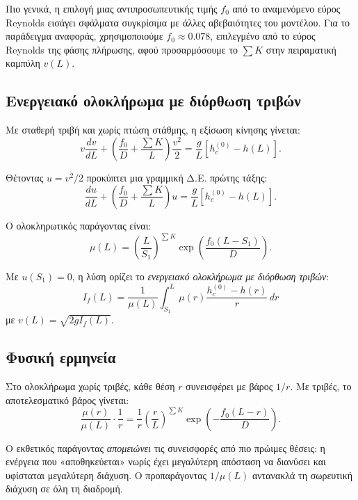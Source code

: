 \documentclass[11pt]{article}
\begin{document}
Πιο γενικά, η επιλογή μιας αντιπροσωπευτικής τιμής $f_0$ από το αναμενόμενο εύρος Reynolds εισάγει σφάλματα συγκρίσιμα με άλλες αβεβαιότητες του μοντέλου. Για το παράδειγμα αναφοράς, χρησιμοποιούμε $f_0 \approx 0.078$, επιλεγμένο από το εύρος Reynolds της φάσης πλήρωσης, αφού προσαρμόσουμε το $\sum K$ στην πειραματική καμπύλη $v(L)$.

\subsection{Ενεργειακό ολοκλήρωμα με διόρθωση τριβών}

Με σταθερή τριβή και χωρίς πτώση στάθμης, η εξίσωση κίνησης γίνεται:
\[
  v \frac{dv}{dL} + \left(\frac{f_0}{D} + \frac{\sum K}{L}\right) \frac{v^2}{2} = \frac{g}{L}[h_c^{(0)} - h(L)].
\]

Θέτοντας $u = v^2/2$ προκύπτει μια γραμμική Δ.Ε. πρώτης τάξης:
\begin{equation}
  \frac{du}{dL} + \left(\frac{f_0}{D} + \frac{\sum K}{L}\right) u = \frac{g}{L}[h_c^{(0)} - h(L)].
  \label{eq:u-ODE}
\end{equation}

Ο ολοκληρωτικός παράγοντας είναι:
\begin{equation}
  \mu(L) = \left(\frac{L}{S_1}\right)^{\sum K} \exp\left(\frac{f_0(L - S_1)}{D}\right).
  \label{eq:integrating-factor}
\end{equation}

Με $u(S_1) = 0$, η λύση ορίζει το \emph{ενεργειακό ολοκλήρωμα με διόρθωση τριβών}:
\begin{equation}
  \boxed{I_f(L) = \frac{1}{\mu(L)} \int_{S_1}^{L} \mu(r) \frac{h_c^{(0)} - h(r)}{r} \, dr}
  \label{eq:I-f-def}
\end{equation}
με $v(L) = \sqrt{2gI_f(L)}$.

\subsection{Φυσική ερμηνεία}

Στο ολοκλήρωμα χωρίς τριβές, κάθε θέση $r$ συνεισφέρει με βάρος $1/r$. Με τριβές, το αποτελεσματικό βάρος γίνεται:
\[
  \frac{\mu(r)}{\mu(L)} \cdot \frac{1}{r} = \frac{1}{r}\left(\frac{r}{L}\right)^{\sum K} \exp\left(-\frac{f_0(L-r)}{D}\right).
\]

Ο εκθετικός παράγοντας \emph{απομειώνει} τις συνεισφορές από πιο πρώιμες θέσεις: η ενέργεια που «αποθηκεύεται» νωρίς έχει μεγαλύτερη απόσταση να διανύσει και υφίσταται μεγαλύτερη διάχυση. Ο προπαράγοντας $1/\mu(L)$ αντανακλά τη σωρευτική διάχυση σε όλη τη διαδρομή.
\end{document}
